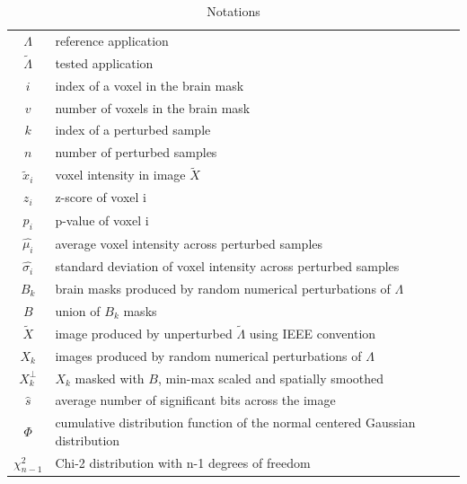 \documentclass[lettersize,journal]{IEEEtran}
\begin{document}
\begin{table}
    \centering
    \begin{tabular}{c|l}
        $\Lambda$        & reference application                                                         \\
        $\tilde \Lambda$ & tested application                                                            \\
        $i$              & index of a voxel in the brain mask                                            \\
        $v$              & number of voxels in the brain mask                                            \\
        $k$              & index of a perturbed sample                                                   \\
        $n$              & number of perturbed samples                                                   \\
        $\tilde x_i$     & voxel intensity in image $\tilde X$                                           \\
        $z_i$            & z-score of voxel i                                                            \\
        $p_i$            & p-value of voxel i                                                            \\
        $\hat{\mu_i}$    & average voxel intensity across perturbed samples                              \\
        $\hat{\sigma_i}$ & standard deviation of voxel intensity across perturbed samples                \\
        $B_k$            & brain masks produced by random numerical perturbations of $\Lambda$           \\
        $B$              & union of $B_k$ masks                                                          \\
        $\tilde X$       & image produced by unperturbed $\tilde \Lambda$ using IEEE convention          \\
        $X_k$            & images produced by random numerical perturbations of $\Lambda$                \\
        $X_k^{\perp}$    & $X_k$ masked with $B$, min-max scaled and spatially smoothed                  \\
        $\hat{s}$        & average number of significant bits across the image                           \\
        $\Phi$           & cumulative distribution function of the normal centered Gaussian distribution \\
        $\chi^2_{n-1}$   & Chi-2 distribution with n-1 degrees of freedom                                \\
    \end{tabular}
    \caption{Notations}
    \label{tab:notations}
\end{table}
\end{document}
